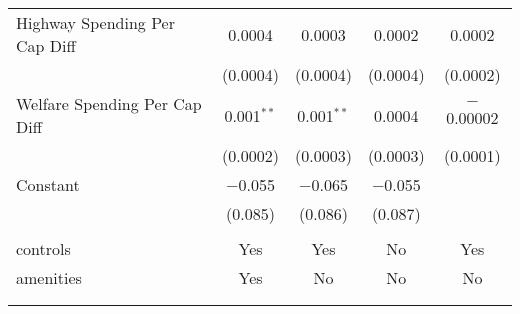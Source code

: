 \begin{table}[!htbp]
\begin{tabular}{@{\extracolsep{5pt}}lcccc}
  Highway Spending Per Cap Diff & 0.0004 & 0.0003 & 0.0002 & 0.0002 \\ 
  & (0.0004) & (0.0004) & (0.0004) & (0.0002) \\ 
  Welfare Spending Per Cap Diff & 0.001$^{**}$ & 0.001$^{**}$ & 0.0004 & $-$0.00002 \\ 
  & (0.0002) & (0.0003) & (0.0003) & (0.0001) \\ 
  Constant & $-$0.055 & $-$0.065 & $-$0.055 &  \\ 
  & (0.085) & (0.086) & (0.087) &  \\ 
 \hline \\[-1.8ex] 
controls & Yes & Yes & No & Yes \\ 
amenities & Yes & No & No & No \\ 
\hline \\[-1.8ex] 
\hline 
\hline \\[-1.8ex] 
\end{tabular} 
\end{table} 
